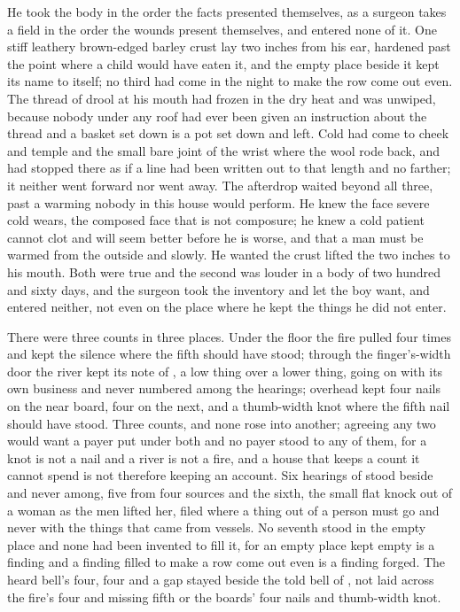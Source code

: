 He took the body in the order the facts presented themselves, as a surgeon takes a field in the order the wounds present themselves, and entered none of it. One stiff leathery brown-edged barley crust lay two inches from his ear, hardened past the point where a child would have eaten it, and the empty place beside it kept its name to itself; no third had come in the night to make the row come out even. The thread of drool at his mouth had frozen in the dry heat and was unwiped, because nobody under any roof had ever been given an instruction about the thread and a basket set down is a pot set down and left. Cold had come to cheek and temple and the small bare joint of the wrist where the wool rode back, and had stopped there as if a line had been written out to that length and no farther; it neither went forward nor went away. The afterdrop waited beyond all three, past a warming nobody in this house would perform. He knew the face severe cold wears, the composed face that is not composure; he knew a cold patient cannot clot and will seem better before he is worse, and that a man must be warmed from the outside and slowly. He wanted the crust lifted the two inches to his mouth. Both were true and the second was louder in a body of two hundred and sixty days, and the surgeon took the inventory and let the boy want, and entered neither, not even on the place where he kept the things he did not enter.

There were three counts in three places. Under the floor the fire pulled four times and kept the silence where the fifth should have stood; through the finger's-width door the river kept its note of , a low thing over a lower thing, going on with its own business and never numbered among the hearings; overhead  kept four nails on the near board, four on the next, and a thumb-width knot where the fifth nail should have stood. Three counts, and none rose into another; agreeing any two would want a payer put under both and no payer stood to any of them, for a knot is not a nail and a river is not a fire, and a house that keeps a count it cannot spend is not therefore keeping an account. Six hearings of  stood beside and never among, five from four sources and the sixth, the small flat knock out of a woman as the men lifted her, filed where a thing out of a person must go and never with the things that came from vessels. No seventh stood in the empty place and none had been invented to fill it, for an empty place kept empty is a finding and a finding filled to make a row come out even is a finding forged. The heard bell's four, four and a gap stayed beside the told bell of , not laid across the fire's four and missing fifth or the boards' four nails and thumb-width knot.

